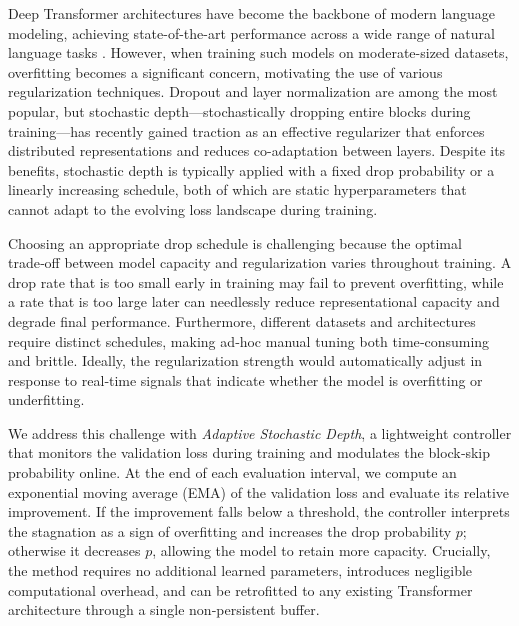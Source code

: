 \documentclass{article} %
\begin{document}
Deep Transformer architectures \citep{vaswani2017attention} have become the backbone of modern language modeling, achieving state-of-the-art performance across a wide range of natural language tasks \citep{radford2019language,karpathy2023nanogpt}.
However, when training such models on moderate-sized datasets, overfitting becomes a significant concern, motivating the use of various regularization techniques.  
Dropout and layer normalization \citep{ba2016layer} are among the most popular, but stochastic depth—stochastically dropping entire blocks during training—has recently gained traction as an effective regularizer that enforces distributed representations and reduces co-adaptation between layers.
Despite its benefits, stochastic depth is typically applied with a fixed drop probability or a linearly increasing schedule, both of which are static hyperparameters that cannot adapt to the evolving loss landscape during training.

Choosing an appropriate drop schedule is challenging because the optimal trade‑off between model capacity and regularization varies throughout training.
A drop rate that is too small early in training may fail to prevent overfitting, while a rate that is too large later can needlessly reduce representational capacity and degrade final performance.
Furthermore, different datasets and architectures require distinct schedules, making ad‑hoc manual tuning both time‑consuming and brittle.
Ideally, the regularization strength would automatically adjust in response to real‑time signals that indicate whether the model is overfitting or underfitting.

We address this challenge with \textit{Adaptive Stochastic Depth}, a lightweight controller that monitors the validation loss during training and modulates the block‑skip probability online.
At the end of each evaluation interval, we compute an exponential moving average (EMA) of the validation loss and evaluate its relative improvement.
If the improvement falls below a threshold, the controller interprets the stagnation as a sign of overfitting and increases the drop probability \(p\); otherwise it decreases \(p\), allowing the model to retain more capacity.
Crucially, the method requires no additional learned parameters, introduces negligible computational overhead, and can be retrofitted to any existing Transformer architecture through a single non‑persistent buffer.
\end{document}
